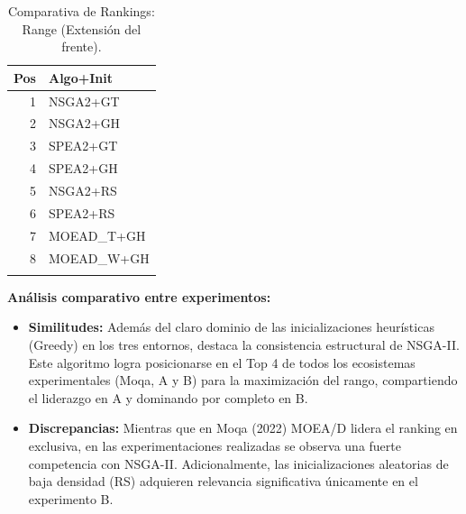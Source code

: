 \documentclass[a4paper,10pt]{article}
\begin{document}
\begin{table}[H]
\begin{minipage}[t]{0.32\textwidth}
\begin{tabular}{rl}
            \toprule
            Pos & Algo+Init \\ \midrule
            1 & NSGA2+GT \\
            2 & NSGA2+GH \\
            3 & SPEA2+GT \\
            4 & SPEA2+GH \\
            5 & NSGA2+RS \\
            6 & SPEA2+RS \\
            7 & MOEAD\_T+GH \\
            8 & MOEAD\_W+GH \\
            \\
            \bottomrule
        \end{tabular}
    \end{minipage}
    \caption{Comparativa de Rankings: Range (Extensión del frente).}
\end{table}

\textbf{Análisis comparativo entre experimentos:}
\begin{itemize}
    \item \textbf{Similitudes:} Además del claro dominio de las inicializaciones heurísticas (Greedy) en los tres entornos, destaca la consistencia estructural de NSGA-II. Este algoritmo logra posicionarse en el Top 4 de todos los ecosistemas experimentales (Moqa, A y B) para la maximización del rango, compartiendo el liderazgo en A y dominando por completo en B.
    \item \textbf{Discrepancias:} Mientras que en Moqa (2022) MOEA/D lidera el ranking en exclusiva, en las experimentaciones realizadas se observa una fuerte competencia con NSGA-II. Adicionalmente, las inicializaciones aleatorias de baja densidad (RS) adquieren relevancia significativa únicamente en el experimento B.
\end{itemize}
\end{document}
